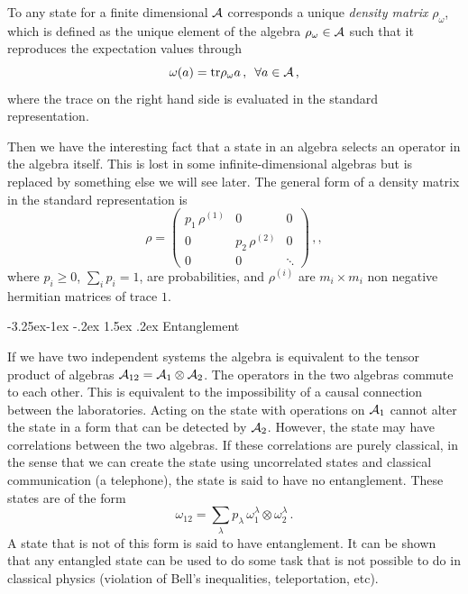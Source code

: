 \documentclass[11pt,a4paper]{article}
\makeatletter
\renewcommand\subsection{\@startsection{subsection}{2}{\z@}%
                                   {-3.25ex\@plus -1ex \@minus -.2ex}%
                                     {1.5ex \@plus .2ex}%
                                     {\normalfont\bfseries}}
\numberwithin{equation}{section}
\newcommand{\be}{\begin{equation}}
\newcommand{\ee}{\end{equation}}
\makeatother
\begin{document}
To any state for a finite dimensional ${\cal A}$ corresponds a unique {\sl density matrix} $\rho_\omega$, which is defined as the unique element of the algebra $ \rho_\omega\in  {\cal A}$ such that it reproduces the expectation values through  
\begin{equation}
\omega (a)=\textrm{tr} \rho_\omega a\,, \,\,\,\forall a\in {\cal A}\,,
 \end{equation} 
where the trace on the right hand side is evaluated in the standard representation. 

Then we have the interesting fact that a state in an algebra selects an operator in the algebra itself. This is lost in some infinite-dimensional algebras but is replaced by something else we will see later.  
The general form of a density matrix in the standard representation is 
\begin{equation}
\rho= \left(\begin{array}{ccc}
  p_1\, \rho^{(1)} & 0 & 0 \\
  0 & p_2 \, \rho^{(2)} & 0\\
  0 & 0 & \ddots
\end{array}\right)\,,,\label{matrtr}
\end{equation}
where $p_i\ge 0$, $\sum_i p_i=1$, are probabilities, and $\rho^{(i)}$ are $m_i\times m_i$ non negative hermitian matrices of trace $1$. 

\subsection{Entanglement}

If we have two independent systems the algebra is equivalent to the tensor product of algebras ${\cal A}_{12}={\cal A}_1\otimes {\cal A}_2$. The operators in the two algebras commute to each other. This is equivalent to the impossibility of a causal connection between the laboratories. Acting on the state with operations on ${\cal A}_1$ cannot alter the state in a form that can be detected by ${\cal A}_2$. However, the state may have correlations between the two algebras. If these correlations are purely classical, in the sense that we can create the state using uncorrelated states and classical communication (a telephone), the state is said to have no entanglement. These states are of the form
\be
\omega_{12} = \sum_\lambda p_\lambda\, \omega_1^\lambda \otimes \omega_2^\lambda\,.
\ee
A state that is not of this form is said to have entanglement. It can be shown that any entangled state can be used to do some task that is not possible to do in classical physics (violation of Bell's inequalities, teleportation, etc). 
\end{document}
